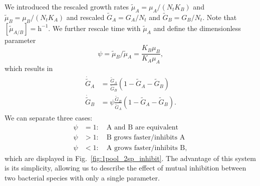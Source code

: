 \documentclass[10pt,1p,authoryear]{elsarticle}
\numberwithin{equation}{section}
\begin{document}
We introduced the rescaled growth rates $\tilde{\mu}_A=\mu_A/(N_tK_B)$ and $\tilde{\mu}_B=\mu_B/(N_tK_A)$ and rescaled $\tilde{G}_A=G_A/N_t$ and $\tilde{G}_B=G_B/N_t$.
Note that $[\tilde{\mu}_{A/B}]=\mathrm{h}^{-1}$.
We further rescale time with $\tilde{\mu}_A$ and define the dimensionless parameter
\begin{equation}
    \psi = \tilde{\mu}_B/\tilde{\mu}_A = \frac{K_B\mu_B}{K_A\mu_A},
\end{equation}
which results in
\begin{align}
    \begin{split}
        \dot{\tilde{G}}_A &=\frac{\tilde{G}_A}{\tilde{G}_B}\left(1 - \tilde{G}_A-\tilde{G}_B\right)\\
        \dot{\tilde{G}}_B &=\psi\frac{\tilde{G}_B}{\tilde{G}_A}\left(1-\tilde{G}_A-\tilde{G}_B\right).
    \end{split}
\label{eq:2sp_1pool_inhibit_unitless}
\end{align}
We can separate three cases:
\begin{align}
    \psi&=1:\quad\text{A and B are equivalent}\\
    \psi&>1:\quad\text{B grows faster/inhibits A}\\
    \psi&<1:\quad\text{A grows faster/inhibits B},
\end{align}
which are displayed in Fig.~\ref{fig:1pool_2sp_inhibit}.
The advantage of this system is its simplicity, allowing us to describe the effect of mutual inhibition between two bacterial species with only a single parameter.
%
\end{document}
